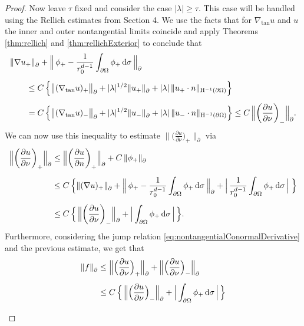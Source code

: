 \begin{proof}
  Now leave $\tau$ fixed and consider the case $|\lambda| \geq \tau$.
  This case will be handled using the Rellich estimates from Section 4.
  We use the facts that for $\nabla_{\mathrm{tan}} u$ and $u$ the inner and outer nontangential limits coincide and apply Theorems \ref{thm:rellich} and \ref{thm:rellichExterior} to conclude that
  \begin{align*}
    &\|\nabla u_+ \|^{}_\partial + \Big\| \, \phi_+ - \frac{1}{r_0^{d - 1}}\int_{\partial\Omega} \phi_+ \, {\operatorname{d}\!{\sigma}} \, \Big\|^{}_\partial \\[0.5em]
      &\qquad\leq C\, \Big\{ \big\|( \nabla_{\mathrm{tan}} u)_+ \big\|_\partial^{} + |\lambda|^{1/2} \|u_+\|^{}_\partial + |\lambda|\,  \| u_+\cdot n\|_{\mathrm{H}^{-1}(\partial\Omega)} \Big\} \\[0.5em]
      &\qquad = C\, \Big\{ \big\|( \nabla_{\mathrm{tan}} u)_- \big\|_\partial^{} + |\lambda|^{1/2} \|u_-\|^{}_\partial + |\lambda| \, \| u_-\cdot n\|_{\mathrm{H}^{-1}(\partial\Omega)} \Big\}
      \leq C\, \Big\| \bigg(\frac{\partial u}{\partial \nu} \bigg)_- \Big\|^{}_\partial.
  \end{align*}
  We can now use this inequality to estimate $\| \big( \frac{\partial u}{\partial \nu} \big)_+ \|^{}_\partial$ via
  \begin{align*}
      \Big\| \bigg( \frac{\partial u}{\partial \nu} \bigg)_+ \Big\|^{}_\partial
      &\leq \Big\|\bigg(\frac{\partial u}{\partial n} \bigg)_+ \Big\|^{}_\partial + C\, \| \phi_+ \|^{}_\partial \\[0.5em]
      &\leq C\,  \Big\{  \| (\nabla u)_+ \|^{}_\partial + \Big\|\, \phi_+ - \frac{1}{r_0^{d - 1}} \int_{\partial\Omega} \phi_+ \, {\operatorname{d}\!{\sigma}} \, \Big\|^{}_\partial + \Big| \, \frac{1}{r_0^{d - 1}} \int_{\partial\Omega} \phi_+ \, {\operatorname{d}\!{\sigma}} \, \Big| \; \Big\}\\[0.5em]
      &\leq C\,  \Big\{ \, \Big\| \bigg(\frac{\partial u}{\partial \nu} \bigg)_- \Big\|^{}_\partial + \Big| \int_{\partial\Omega} \phi_+ \, {\operatorname{d}\!{\sigma}} \, \Big|\,\Big\}.
  \end{align*}
  Furthermore, considering the jump relation \eqref{eq:nontangentialConormalDerivative} and the previous estimate, we get that
  \begin{align}
      \|f \|^{}_\partial 
      &\leq \Big\|\Big( \frac{\partial u}{\partial \nu} \Big)_+ \Big\|^{}_\partial + \Big\| \Big( \frac{\partial u}{\partial \nu} \Big)_- \Big\|^{}_\partial  \nonumber\\[0.5em]
      &\leq C \,\Big\{ \,  \Big\| \Big( \frac{\partial u}{\partial \nu} \Big)_- \Big\|^{}_\partial + \Big| \int_{\partial\Omega} \phi_+ \d\sigma \, \Big|\, \Big\} \nonumber\\[0.5em]

\end{align}
\end{proof}
